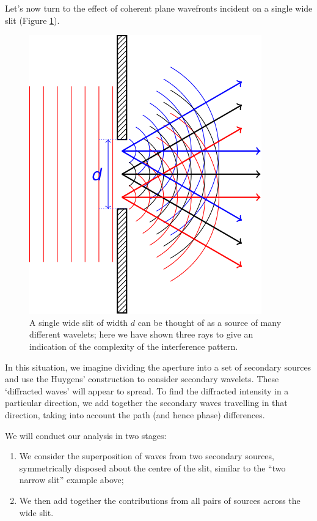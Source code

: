 \documentclass[
]{book}
\providecommand{\tightlist}{%
  \setlength{\itemsep}{0pt}\setlength{\parskip}{0pt}}
\begin{document}
Let's now turn to the effect of coherent plane wavefronts incident on a single wide slit (Figure \ref{fig:ch13-singlewideslit1}).

\begin{figure}

{\centering \includegraphics[width=0.7\linewidth]{visualisations/LaTeX/ch13-singlewideslit1} 

}

\caption{A single wide slit of width $d$ can be thought of as a source of many different wavelets; here we have shown three rays to give an indication of the complexity of the interference pattern.}\label{fig:ch13-singlewideslit1}
\end{figure}

In this situation, we imagine dividing the aperture into a set of secondary sources and use the Huygens' construction to consider secondary wavelets. These `diffracted waves' will appear to spread. To find the diffracted intensity in a particular direction, we add together the secondary waves travelling in that direction, taking into account the path (and hence phase) differences.

We will conduct our analysis in two stages:

\begin{enumerate}
\def\labelenumi{\arabic{enumi}.}
\tightlist
\item
  We consider the superposition of waves from two secondary sources, symmetrically disposed about the centre of the slit, similar to the ``two narrow slit'' example above;
\item
  We then add together the contributions from all pairs of sources across the wide slit.
\end{enumerate}
\end{document}
